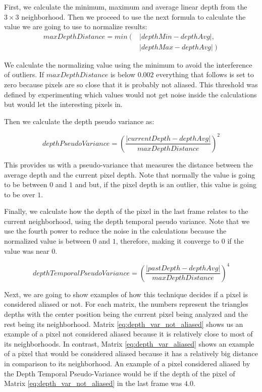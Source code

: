 \documentclass[pregrado]{tesis-usb} %
\begin{document}
First, we calculate the minimum, maximum and average linear depth from the $3\times 3$ neighborhood. Then we proceed to use the next formula to calculate the value we are going to use to normalize results:
\begin{equation} \label{eq:maxdepthdistance}
\begin{split} 
	maxDepthDistance = min \left( \right. & \left| depthMin-depthAvg \right|  ,   \\ 
	 &  \left.\left| depthMax-depthAvg\right| \right) 
\end{split} 
\end{equation}

We calculate the normalizing value using the minimum to avoid the interference of outliers. If $maxDepthDistance$  is below $0.002$ everything that follows is set to zero because pixels are so close that it is probably not aliased. This threshold was defined by experimenting which values would not get noise inside the calculations but would let the interesting pixels in. 

Then we calculate the depth pseudo variance as:

\begin{equation} \label{eq:depthpseudovariance}
	depthPseudoVariance = \left( \frac{\left|currentDepth-depthAvg\right|}{maxDepthDistance}\right)^2
\end{equation}

This provides us with a pseudo-variance that measures the distance between the average depth and the current pixel depth. Note that normally the value is going to be between $0$ and $1$ and but, if the pixel depth is an outlier, this value is going to be over $1$.

Finally, we calculate how the depth of the pixel in the last frame relates to the current neighborhood, using the depth temporal pseudo variance. Note that we use the fourth power to reduce the noise in the calculations because the normalized value is between $0$ and $1$, therefore, making it converge to $0$ if the value was near $0$.

\begin{equation} \label{eq:depthtemporalpseudovariance}
depthTemporalPseudoVariance = \left( \frac{\left|pastDepth-depthAvg\right|}{maxDepthDistance}\right)^4
\end{equation}

Next, we are going to show examples of how this technique decides if a pixel is considered aliased or not. For each matrix, the numbers represent the triangles depths with the center position being the current pixel being analyzed and the rest being its neighborhood.  Matrix \ref{eq:depth_var_not_aliased} shows us an example of a pixel not considered aliased because it is relatively close to most of its neighborhoods. In contrast, Matrix \ref{eq:depth_var_aliased} shows an example of a pixel that would be considered aliased because it has a relatively big distance in comparison to its neighborhood. An example of a pixel considered aliased by the Depth Temporal Pseudo-Variance would be if the depth of the pixel of Matrix  \ref{eq:depth_var_not_aliased} in the last frame was $4.0$.
\end{document}
